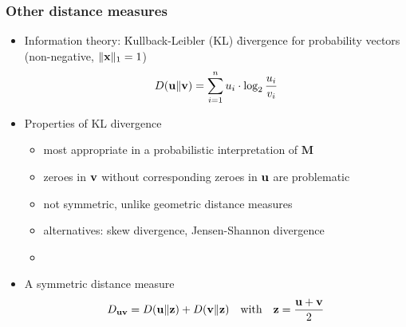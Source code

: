 \documentclass[t]{beamer} %
\begin{document}
\begin{frame}
  \frametitle{Other distance measures}
  
  \begin{itemize}
  \item Information theory: \h{Kullback-Leibler} (KL) \h{divergence} for probability vectors (non-negative, $\norm[1]{\vx} = 1$)
    \[
    \KL{\vu}{\vv} = \sum_{i=1}^n u_i \cdot \log_2 \frac{u_i}{v_i}
    \]
    \pause
  \item Properties of KL divergence
    \begin{itemize}
    \item most appropriate in a probabilistic interpretation of $\mathbf{M}$
    \item zeroes in $\vv$ without corresponding zeroes in $\vu$ are problematic
    \item not symmetric, unlike geometric distance measures
    \item alternatives: skew divergence, Jensen-Shannon divergence
    \item[]
    \end{itemize}
    \pause
  \item A symmetric distance measure \citep{Endres:Schindelin:03}
    \[
    D_{\vu\vv} = \KL{\vu}{\vz} + \KL{\vv}{\vz} \quad \text{with} \quad \vz = \frac{\vu + \vv}{2}
    \]
  \end{itemize}
\end{frame}
\end{document}
